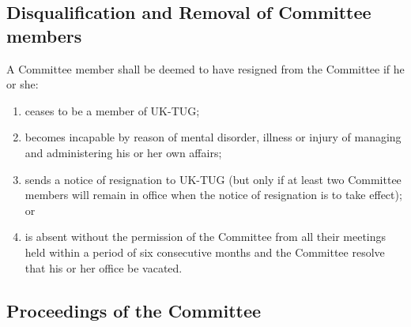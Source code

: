 \documentclass[a4paper,11pt]{article}
\begin{document}
\subsection{Disqualification and Removal of Committee members}
\label{Disqualification}

A Committee member shall be deemed to have resigned from the Committee if he or she:
\begin{enumerate}
\item ceases to be a member of UK-TUG;
\item becomes incapable by reason of mental disorder, illness or injury of
  managing and administering his or her own affairs;
\item sends a notice of resignation to UK-TUG (but only if at least
  two Committee members will remain in office when the notice of resignation is
  to take effect); or
\item is absent without the permission of the Committee from all their meetings
  held within a period of six consecutive months and the Committee resolve that
  his or her office be vacated.
\end{enumerate}

\subsection{Proceedings of the Committee}
\end{document}
